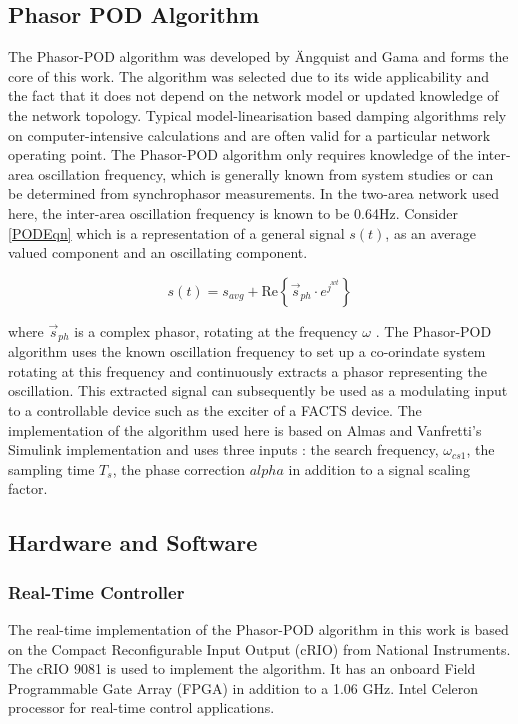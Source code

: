 \documentclass[conference]{IEEEtran}
\begin{document}
\subsection{Phasor POD Algorithm}
The Phasor-POD algorithm was developed by \"{A}ngquist and Gama\cite{PhasorPOD} and forms the core of this work. The algorithm was selected due to its wide applicability and the fact that it does not depend on the network model or updated knowledge of the network topology. Typical model-linearisation based damping algorithms rely on computer-intensive calculations and are often valid for a particular network operating point. The Phasor-POD algorithm only requires knowledge of the inter-area oscillation frequency, which is generally known from system studies or can be determined from synchrophasor measurements. In the two-area network used here, the inter-area oscillation frequency is known to be 0.64Hz. Consider \ref{PODEqn} which is a representation of a general signal $s(t)$, as an average valued component and an oscillating component.

\begin{equation}
s(t)={s}_{avg}+\mathrm{Re}\left\{{\stackrel{\to }{s}}_{ph}\cdot {e}^{{j}^{wt}}\right\}
\label{PODEqn}
\end{equation}

where $\stackrel{\to}{s}_{ph}$ is a complex phasor, rotating at the frequency $\omega$ \cite{PhasorPOD}. The Phasor-POD algorithm uses the known oscillation frequency to set up a co-orindate system rotating at this frequency and continuously extracts a phasor representing the oscillation\cite{PhasorPOD}. This extracted signal can subsequently be used as a modulating input to a controllable device such as the exciter of a FACTS device. The implementation of the algorithm used here is based on Almas and Vanfretti's Simulink implementation \cite{PhasorPODImplement} and uses three inputs : the search frequency, $\omega_{cs1}$, the sampling time $T_{s}$, the phase correction $alpha$ in addition to a signal scaling factor.

\subsection{Hardware and Software}
\subsubsection*{Real-Time Controller} The real-time implementation of the Phasor-POD algorithm in this work is based on the Compact Reconfigurable Input Output (cRIO) from National Instruments. The cRIO 9081 is used to implement the algorithm. It has an onboard Field Programmable Gate Array (FPGA) in addition to a 1.06 GHz. Intel Celeron processor for real-time control applications\cite{cRIO9081}.
\end{document}
